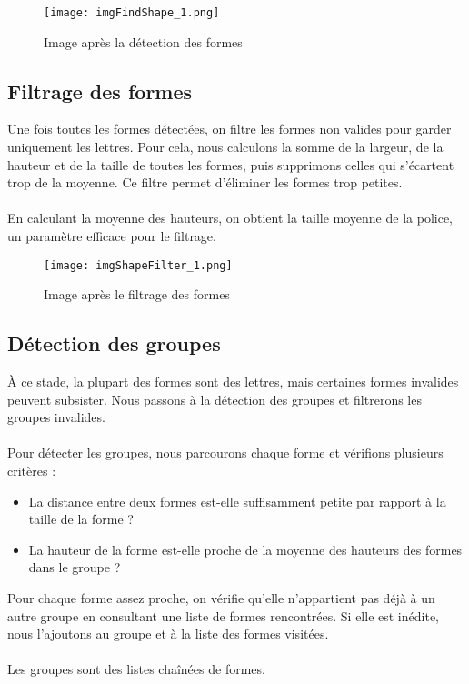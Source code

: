\documentclass{article}
\begin{document}
\vspace{0.5cm}

\begin{figure}[H]
    \centering
    \texttt{[image: imgFindShape\_1.png]}
    \caption{Image après la détection des formes}
\end{figure}

\subsection{Filtrage des formes}

Une fois toutes les formes détectées, on filtre les formes non valides pour garder uniquement les lettres. Pour cela, nous calculons la somme de la largeur, de la hauteur et de la taille de toutes les formes, puis supprimons celles qui s'écartent trop de la moyenne. Ce filtre permet d’éliminer les formes trop petites.
\\\\
En calculant la moyenne des hauteurs, on obtient la taille moyenne de la police, un paramètre efficace pour le filtrage.

\begin{figure}[H]
    \centering
    \texttt{[image: imgShapeFilter\_1.png]}
    \caption{Image après le filtrage des formes}
\end{figure}

\subsection{Détection des groupes}

À ce stade, la plupart des formes sont des lettres, mais certaines formes invalides peuvent subsister. Nous passons à la détection des groupes et filtrerons les groupes invalides.
\\\\
Pour détecter les groupes, nous parcourons chaque forme et vérifions plusieurs critères :
\begin{itemize}
    \item La distance entre deux formes est-elle suffisamment petite par rapport à la taille de la forme ?
    \item La hauteur de la forme est-elle proche de la moyenne des hauteurs des formes dans le groupe ?
\end{itemize}
\vspace{0.5cm}
Pour chaque forme assez proche, on vérifie qu'elle n'appartient pas déjà à un autre groupe en consultant une liste de formes rencontrées. Si elle est inédite, nous l’ajoutons au groupe et à la liste des formes visitées.
\\\\
Les groupes sont des listes chaînées de formes.
\end{document}
